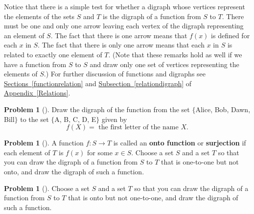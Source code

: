 \documentclass[10pt,]{book}
\newcommand{\terminology}[1]{\textbf{#1}}
\theoremstyle{plain}
\theoremstyle{definition}
\newtheorem{activity}[project]{Problem}
\theoremstyle{definition}
\numberwithin{equation}{chapter}
\begin{document}
\par
\hypertarget{p-129}{}%
Notice that there is a simple test for whether a digraph whose vertices represent the elements of the sets \(S\) and \(T\) is the digraph of a function from \(S\) to \(T\). There must be one and only one arrow leaving each vertex of the digraph representing an element of \(S\). The fact that there is one arrow means that \(f(x)\) is defined for each \(x\) in \(S\). The fact that there is only one arrow means that each \(x\) in \(S\) is related to exactly one element of \(T\). (Note that these remarks hold as well if we have a function from \(S\) to \(S\) and draw only one set of vertices representing the elements of \(S\).) For further discussion of functions and digraphs see \hyperref[functionrelation]{Sections~\ref{functionrelation}} and \hyperref[relationdigraph]{Subsection~\ref{relationdigraph}} of {\hyperref[Relations]{Appendix~\ref{Relations}}}.%
\begin{activity}[] \label{activity-23}
\hypertarget{p-130}{}%
Draw the digraph of the function from the set \(\{\)Alice, Bob, Dawn, Bill\(\}\) to the set \(\{\)A, B, C, D, E\(\}\) given by%
\begin{equation*}
f(X) = \text{ the first letter of the name }X .
\end{equation*}
%
\end{activity}
\begin{activity}[] \label{activity-24}
\hypertarget{p-131}{}%
A function \(f:S\rightarrow T\) is called an \terminology{onto function} or \terminology{surjection} if each element of \(T\) is \(f(x)\) for some \(x\in S\). Choose a set \(S\) and a set \(T\) so that you can draw the digraph of a function from \(S\) to \(T\) that is one-to-one but not onto, and draw the digraph of such a function.%
\end{activity}
\begin{activity}[] \label{activity-25}
\hypertarget{p-133}{}%
Choose a set \(S\) and a set \(T\) so that you can draw the digraph of a function from \(S\) to \(T\) that is onto but not one-to-one, and draw the digraph of such a function.%
\end{activity}
\end{document}
